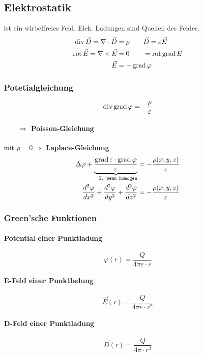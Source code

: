 \subsection{Elektrostatik}
ist ein wirbelfreies Feld. Elek. Ladungen sind Quellen des Feldes.
\begin{align*}
    \operatorname{div} \vec{D} = \nabla \cdot \vec{D}  & = \rho       \qquad          \vec{D} = \varepsilon \vec{E} \\
    \operatorname{rot} \vec{E} = \nabla \times \vec{E} & = 0          \qquad          = \operatorname{rot} \operatorname{grad} E            \\
    \vec{E}                                & =- \operatorname{grad} \varphi
\end{align*}
\subsubsection{Potetialgleichung}
\[
    \operatorname{div} \operatorname{grad} \varphi = - \dfrac{\rho}{\varepsilon}
\]
\paragraph{$\qquad \Rightarrow$ Poisson-Gleichung}
mit $\rho = 0 \Rightarrow$ \textbf{Laplace-Gleichung}
\begin{align*}
    \Delta \varphi + \underbrace{ \dfrac{\operatorname{grad} \varepsilon \cdot \operatorname{grad} \varphi}{\varepsilon}}_{= 0\texttt{, wenn homogen}}
     & = - \dfrac{\rho (x, y, z)}{\varepsilon} \\
    \frac{d^2 \varphi}{d x^2} + \frac{d^2 \varphi}{d y^2} + \frac{d^2 \varphi}{d z^2}
     & = - \dfrac{\rho (x, y, z)}{\varepsilon}
\end{align*}

\subsubsection{Green'sche Funktionen}
\paragraph*{Potential einer Punktladung}
\[ \varphi (r) = \dfrac{Q}{4 \pi \varepsilon \cdot r} \]

\paragraph*{E-Feld einer Punktladung}
\[ \vec{E}(r) = \dfrac{Q}{4 \pi \varepsilon \cdot r^2} \]

\paragraph*{D-Feld einer Punktladung}
\[ \vec{D}(r) = \dfrac{Q}{4 \pi \cdot r^2} \]

